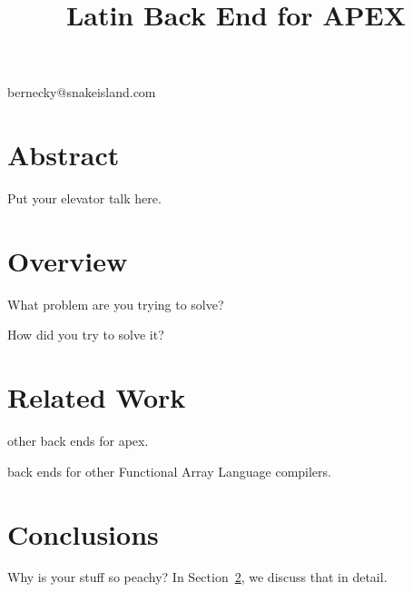 \documentclass[11pt,preprint]{sigplanconf}
\begin{document}

\title{Latin Back End for APEX}

{bernecky@snakeisland.com}

\maketitle

\def\ibmapl{$APL\backslash\0360$}

\newcommand{\fixme}[1]{{ \color{red} \bf FIXME: #1}}

\newcommand{\fig}[2]{{%
\begin{figure}%
\texttt{[image: \#1]}%
\caption{#2}%
\label{#1}%
\end{figure}%
}}

\section{Abstract}

 Put your elevator talk here.


\section{Overview}
\label{overview}

 What problem are you trying to solve?

 How did you try to solve it?

\section{Related Work}

 other back ends for apex.\cite{RBernecky:apex}

 back ends for other Functional Array Language
 compilers.

\section{Conclusions}

Why is your stuff so peachy?
In Section~\ref{overview}, we discuss that in detail.


\begin{onecolumn}
 

\end{onecolumn}
\end{document}
